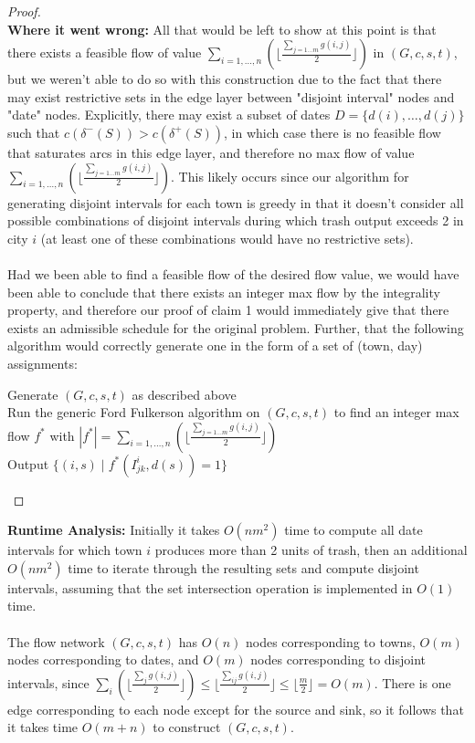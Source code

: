 \documentclass[12pt]{article}
\begin{document}
\begin{proof}
\\\textbf{Where it went wrong:} All that would be left to show at this point is that there exists a feasible flow of value $\sum_{i=1,\dots,n} (\lfloor \frac{\sum_{j = 1\dots m} g(i,j)}{2} \rfloor)$ in $(G,c,s,t)$, but we weren't able to do so with this construction due to the fact that there may exist restrictive sets in the edge layer between "disjoint interval" nodes and "date" nodes. Explicitly, there may exist a subset of dates $D = \{d(i), \dots, d(j)\}$ such that $c(\delta^-(S)) > c(\delta^+(S))$, in which case there is no feasible flow that saturates arcs in this edge layer, and therefore no max flow of value $\sum_{i=1,\dots,n} (\lfloor \frac{\sum_{j = 1\dots m} g(i,j)}{2} \rfloor)$. This likely occurs since our algorithm for generating disjoint intervals for each town is greedy in that it doesn't consider all possible combinations of disjoint intervals during which trash output exceeds 2 in city $i$ (at least one of these combinations would have no restrictive sets).\\
\\Had we been able to find a feasible flow of the desired flow value, we would have been able to conclude that there exists an integer max flow by the integrality property, and therefore our proof of claim 1 would immediately give that there exists an admissible schedule for the original problem. Further, that the following algorithm would correctly generate one in the form of a set of (town, day) assignments:\\
    \begin{algorithm}[H]
    \SetAlgoLined
    Generate $(G,c,s,t)$ as described above\\
    Run the generic Ford Fulkerson algorithm on $(G,c,s,t)$ to find an integer max flow $f^*$ with $|f^*| = \sum_{i=1,\dots,n} (\lfloor \frac{\sum_{j = 1\dots m} g(i,j)}{2} \rfloor)$ \\
    Output $\{(i,s) \; | \; f^*(I^i_{jk}, d(s)) = 1\}$
    \end{algorithm}
\end{proof}
\textbf{Runtime Analysis:}
Initially it takes $O(nm^2)$ time to compute all date intervals for which town $i$ produces more than 2 units of trash, then an additional $O(nm^2)$ time to iterate through the resulting sets and compute disjoint intervals, assuming that the set intersection operation is implemented in $O(1)$ time.\\
\\The flow network $(G,c,s,t)$ has $O(n)$ nodes corresponding to towns, $O(m)$ nodes corresponding to dates, and $O(m)$ nodes corresponding to disjoint intervals, since $\sum_i(\lfloor \frac{\sum_{j} g(i,j)}{2} \rfloor)\leq \lfloor \frac{\sum_{ij} g(i,j)}{2} \rfloor \leq \lfloor \frac{m}{2} \rfloor = O(m)$. There is one edge corresponding to each node except for the source and sink, so it follows that it takes time $O(m+n)$ to construct $(G,c,s,t)$.\\
\end{document}
